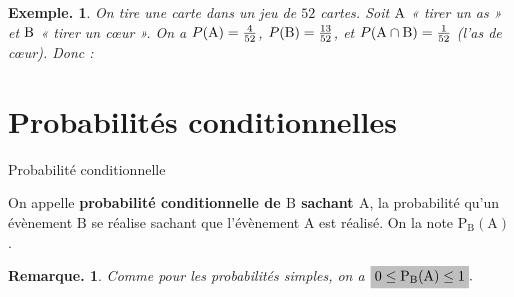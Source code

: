 \documentclass[12pt]{article}
\theoremstyle{break}
\newtheorem*{example}{Exemple.}
\newtheorem*{remark}{Remarque.}
\begin{document}
\begin{example}
On tire une carte dans un jeu de $52$ cartes. Soit $\mathrm{A}$ « tirer un as » et $\mathrm{B}$ « tirer un c\oe ur ». On a $P(\mathrm{A})=\frac{4}{52}$, $P(\mathrm{B})=\frac{13}{52}$, et $P(\mathrm{A}\cap \mathrm{B})=\frac{1}{52}$ (l'as de c\oe ur). Donc :
  
  \vspace{0.2em}
  \framebox[1\linewidth]{\parbox{5.5in}{%
  \[
  \hideMW{\P(\A\cup \B) = \frac{4}{52}+\frac{13}{52}-\frac{1}{52} = \frac{16}{52} = \frac{4}{13}.}
  \]
  \vspace{-1em}
  }}
\end{example} 



\vspace{-1em}
\section{Probabilités conditionnelles}

\begin{definition}{Probabilité conditionnelle}{}
  \begin{multihide}
  On appelle \textbf{probabilité conditionnelle de ${\mathrm B}$ sachant ${\mathrm A}$}, la probabilité qu'un évènement ${\mathrm B}$ se réalise sachant que l'évènement ${\mathrm A}$ est réalisé. On la note ${\mathrm P}_{\mathrm B}({\mathrm A})$.
  \end{multihide}
\end{definition}

\begin{remark}
  Comme pour les probabilités simples, on a $\hideM{0 \le {\mathrm P}_{\mathrm B}(\mathrm A) \le 1}.$
\end{remark}
\end{document}
